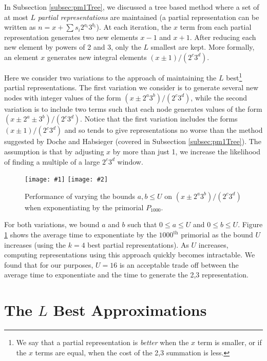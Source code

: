 \documentclass{ucalgthes1}
\theoremstyle{definition}
\newcommand{\mygraphTwo}[4]{
	\begin{figure}[H]
	\centering
	\texttt{[image: \#1]}
	\texttt{[image: \#2]}
	\caption{#4}
	\label{#3}
	\end{figure}
}
\begin{document}
In Subsection \ref{subsec:pm1Tree}, we discussed a tree based method where a set of at most $L$ \emph{partial representations} are maintained (a partial representation can be written as $n = x + \sum s_i2^{a_i}3^{b_i}$).  At each iteration, the $x$ term from each partial representation generates two new elements $x-1$ and $x+1$.  After reducing each new element by powers of 2 and 3, only the $L$ smallest are kept.  More formally, an element $x$ generates new integral elements $(x \pm 1)/(2^c3^d)$.

Here we consider two variations to the approach of maintaining the $L$ best\footnote{We say that a partial representation is \emph{better} when the $x$ term is smaller, or if the $x$ terms are equal, when the cost of the 2,3 summation is less.} partial representations. The first variation we consider is to generate several new nodes with integer values of the form $(x \pm 2^a3^b)/(2^c3^d)$, while the second variation is to include two terms such that each node generates values of the form $(x \pm 2^a \pm 3^b) / (2^c 3^d)$.  Notice that the first variation includes the forms $(x \pm 1)/(2^c 3^d)$ and so tends to give representations no worse than the method suggested by Doche and Habsieger \cite{Doche2008} (covered in Subsection \ref{subsec:pm1Tree}).  The assumption is that by adjusting $x$ by more than just 1, we increase the likelihood of finding a multiple of a large $2^c3^d$ window.

\mygraphTwo{pm2a3b_vary_max-64}{pm2a3b_vary_max-128}{fig:pm2a3bVaryMax}{Performance of varying the bounds $a, b \le U$ on $(x \pm 2^a3^b)/(2^c3^d)$ when exponentiating by the primorial $P_{1000}$.}
For both variations, we bound $a$ and $b$ such that $0 \le a \le U$ and $0 \le b \le U$.  Figure \ref{fig:pm2a3bVaryMax} shows the average time to exponentiate by the $1000^{\textrm{th}}$ primorial as the bound $U$ increases (using the $k=4$ best partial representations).  As $U$ increases, computing representations using this approach quickly becomes intractable.  We found that for our purposes, $U=16$ is an acceptable trade off between the average time to exponentiate and the time to generate the 2,3 representation.


\section{The $L$ Best Approximations}
\end{document}
